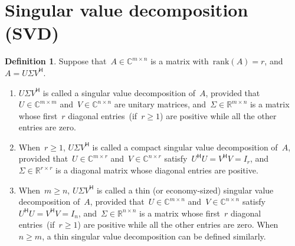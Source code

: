 \documentclass[11pt,a4paper]{article}  %
\numberwithin{equation}{section}
\newtheorem{remark}{Remark}%
\theoremstyle{definition}
\newtheorem{definition}{Definition}%
\def\RR{\mathbb{R}}
\def\CC{\mathbb{C}}
\newcommand{\hmt}{{\scriptscriptstyle{{\mathsf{H}}}}}
\newcommand{\rank}{\mathrm{rank}}
\begin{document}


\section{Singular value decomposition (SVD)}

\begin{definition}
  \label{def:svd}
  Suppose that~$A\in \CC^{m\times n}$ is a matrix with~$\rank(A) = r$, and~$A = U\Sigma V^\hmt$.
  \begin{enumerate}[leftmargin=1.5em]
    \item
      $U\Sigma V^\hmt$ is called a singular value decomposition of~$A$,
      provided that~$U \in \CC^{m\times m}$ and~$V\in\CC^{n\times n}$ are unitary matrices,
      and~$\Sigma \in \RR^{m\times n}$ is a matrix whose first~$r$ diagonal entries~(if~$r\ge 1$)
      are positive while all the other entries are zero.
    \item
      When~$r \ge 1$, $U\Sigma V^\hmt$ is called a compact singular value decomposition of~$A$,
      provided that~$U \in \CC^{m\times r}$ and~$V\in \CC^{n\times r}$ satisfy~$U^\hmt U = V^\hmt V = I_r$,
      and~$\Sigma \in \RR^{r\times r}$ is a diagonal matrix whose diagonal entries are positive.
  \item When~$m\ge n$, $U\Sigma V^\hmt$ is called a thin (or economy-sized) singular value
      decomposition of~$A$,
      provided that~$U \in \CC^{m\times n}$ and~$V\in \CC^{n\times n}$ satisfy~$U^\hmt U = V^\hmt V = I_n$,
      and~$\Sigma \in \RR^{n\times n}$ is a matrix whose first~$r$ diagonal entries~(if~$r\ge 1$)
      are positive while all the other entries are zero.
      When~$n\ge m$, a thin singular value decomposition can be defined similarly.
  \end{enumerate}
\end{definition}
\end{document}

